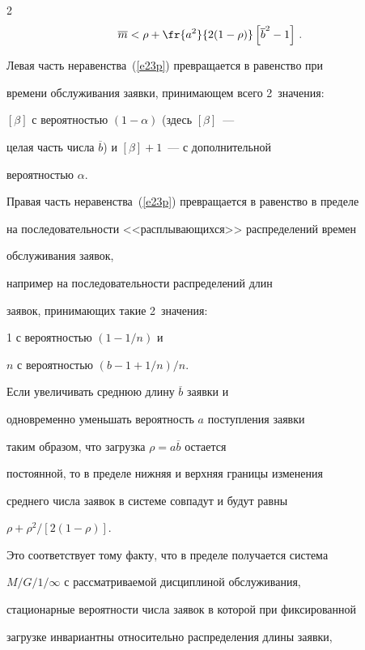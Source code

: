 \begin{multicols}{2}
\begin{multline}
\overline m < \rho + \fr{a^2}{2(1-\rho)}


\left [ \overline b^2 - 1\right ]\,.


\label{e23p}


\end{multline}





Левая часть неравенства~(\ref{e23p}) превращается в равенство при


времени обслуживания заявки, принимающем всего 2~значения:


$[\beta]$ с вероятностью $(1-\alpha)$ (здесь $[\beta]$~---


целая часть числа $\overline b$) и $[\beta]+1$~--- с дополнительной


вероятностью $\alpha$.





Правая часть неравенства~(\ref{e23p}) превращается в равенство в пределе


на последовательности <<расплывающихся>> распределений времен


обслуживания заявок,


например на последовательности распределений длин


заявок, принимающих такие 2~значения:


1 с вероятностью $(1-1/n)$ и


$n$ с вероятностью $(b-1+1/n)/n$.





Если увеличивать среднюю длину $\overline b$ заявки и


одновременно уменьшать вероятность $a$ поступления заявки


таким образом, что загрузка $\rho=a\overline b$ остается


постоянной, то в пределе нижняя и верхняя границы изменения


среднего числа заявок в системе совпадут и будут равны


$\rho + \rho^2 /\left [ 2 (1-\rho)\right ]$.


Это соответствует тому факту, что в пределе получается система


$M/G/1/\infty$ с рассматриваемой дисциплиной обслуживания,


стационарные вероятности чис\-ла заявок в которой при фиксированной


загрузке инвариантны относительно распределения длины заявки,



\end{multicols}
